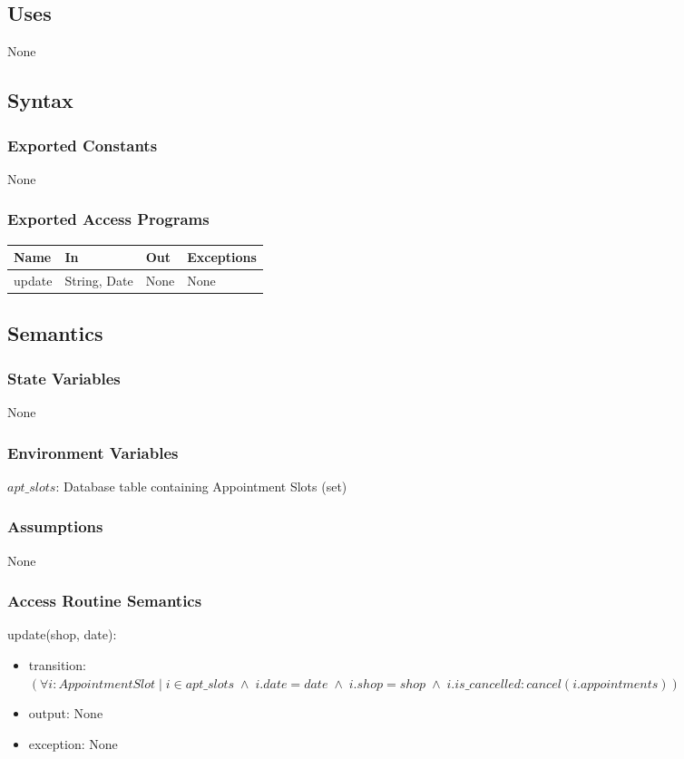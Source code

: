 \documentclass[12pt, titlepage]{article}
\begin{document}
\subsection{Uses}
None

\subsection{Syntax}

\subsubsection{Exported Constants}
None

\subsubsection{Exported Access Programs}

\begin{center}
\begin{tabular}{p{2cm} p{4cm} p{4cm} p{2cm}}
\hline
\textbf{Name} & \textbf{In} & \textbf{Out} & \textbf{Exceptions} \\
\hline
update & String, Date & None & None \\
\hline
\end{tabular}
\end{center}

\subsection{Semantics}

\subsubsection{State Variables}
None

\subsubsection{Environment Variables}
$apt\_slots$: Database table containing Appointment Slots (set)

\subsubsection{Assumptions}
None

\subsubsection{Access Routine Semantics}
\noindent update(shop, date):
\begin{itemize}
\item transition: \\
$(\forall i:AppointmentSlot \; | \; i \in apt\_slots \; \land \; i.date = date \; \land \; i.shop = shop \; \land \; i.is\_cancelled : cancel(i.appointments))$
\item output: None
\item exception: None
\end{itemize}
\end{document}
